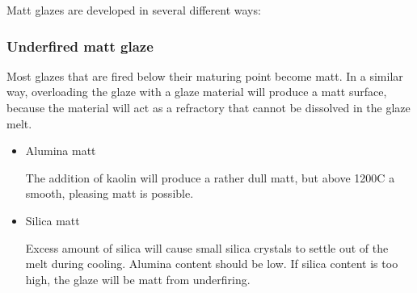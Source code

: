 Matt glazes are developed in several different ways:
\subsubsection{Underfired matt glaze}
Most glazes that are fired below their maturing point become matt. In a similar 
way, overloading the glaze with a glaze material will produce a matt surface, 
because the material will act as a refractory that cannot be dissolved in the 
glaze melt.
\begin{itemize}
\item Alumina matt

The addition of kaolin will produce a rather dull matt, but above 1200\degree C 
a smooth, pleasing matt is possible.

\item Silica matt

Excess amount of silica will cause small silica crystals to settle out of the 
melt during cooling. Alumina content should be low. If silica content is too 
high, the glaze will be matt from underfiring.
\end{itemize}

